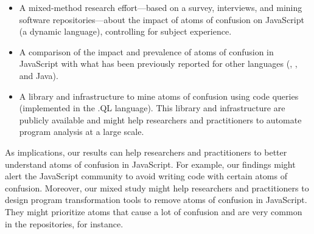 \begin{itemize}
    
\item A mixed-method research effort---based on a survey, interviews, and mining software
  repositories---about the impact of atoms of confusion on JavaScript (a
    dynamic language), controlling for subject experience.

  \item A comparison of the impact and prevalence of atoms of confusion in
    JavaScript with what has been previously reported for other languages
    (\clang, \cpplang, and Java).

    
    \item A library and infrastructure to mine atoms of confusion using 
    code queries (implemented in the .QL language). This library and 
    infrastructure are publicly available and might help researchers and 
    practitioners to automate program analysis at a large scale.

\end{itemize}

As implications, our results can help researchers and practitioners to better understand atoms of confusion in JavaScript. For example, our findings might alert the JavaScript community to avoid writing code with certain atoms of confusion. Moreover, our mixed study might help researchers and practitioners to design program transformation tools to remove atoms of confusion in JavaScript. They might prioritize atoms that cause a lot of confusion and are very common in the repositories, for instance.









